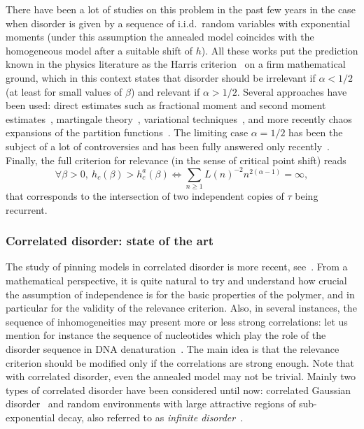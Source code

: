 \documentclass[AHL,Unicode,longabstracts]{cedram}
\newcommand{\ga}{\alpha}
\newcommand{\gb}{\beta}
\let\oldforall\forall
\renewcommand*{\forall}{\mathrel{\oldforall}}
\begin{document}
There have been a lot of studies on this problem in the past few years in the case when disorder is given by a sequence of i.i.d.~random variables with exponential moments (under this assumption the annealed model coincides with the homogeneous model after a suitable shift of $h$). All these works put the prediction known in the physics literature as the Harris criterion~\cite{H74} on a firm mathematical ground, which in this context states that disorder should be irrelevant if $\ga < 1/2$ (at least for small values of $\beta$) and relevant if $\ga > 1/2$. Several approaches have been used: direct estimates such as fractional moment and second moment estimates~\cite{AS06, AZ09, BL15, BCPSZ14, CadH13, DGLT09, GiT2006, GTL09}, martingale theory~\cite{L10}, variational techniques~\cite{CdH13}, and more recently chaos expansions of the partition functions~\cite{CSZ16+,CSZ16,CTT16+}. The limiting case $\ga = 1/2$ has been the subject of a lot of controversies and has been fully answered only recently~\cite{BL15}. Finally, the full criterion for relevance (in the sense of critical point shift) reads
\begin{equation}
\forall \gb > 0,\ h_c(\gb) > h_c^a(\gb) \iff \sum_{n \geq 1} L(n)^{- 2} n^{2 (\ga - 1)} = \infty,
\end{equation}
that corresponds to the intersection of two independent copies of $\tau$ being recurrent.

\subsubsection{Correlated disorder: state of the art}

The study of pinning models in correlated disorder is more recent, see~\cite{B13, B14, BL12, BP15, P13}. From a mathematical perspective, it is quite natural to try and understand how crucial the assumption of independence is for the basic properties of the polymer, and in particular for the validity of the relevance criterion. Also, in several instances, the sequence of inhomogeneities may present more or less strong correlations: let us mention for instance the sequence of nucleotides which play the role of the disorder sequence in DNA denaturation~\cite{JPS06}. The main idea is that the relevance criterion should be modified only if the correlations are strong enough. Note that with correlated disorder, even the annealed model may not be trivial. Mainly two types of correlated disorder have been considered until now: correlated Gaussian disorder~\cite{B13, BP15, P13} and random environments with large attractive regions of sub-exponential decay, also referred to as \emph{infinite disorder}~\cite{B14, BL12}.
\end{document}
